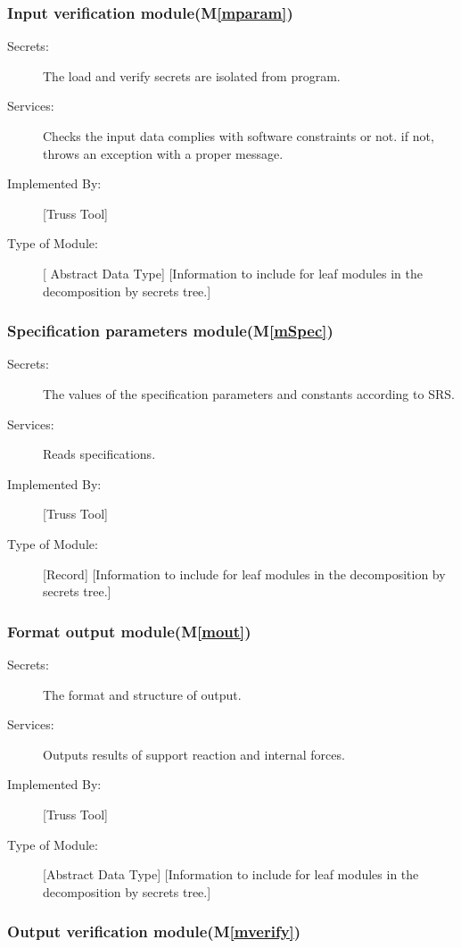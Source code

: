 \documentclass[12pt, titlepage]{article}
\newcommand{\mref}[1]{M\ref{#1}}
\begin{document}
\subsubsection{Input verification module(\mref{mparam})}

\begin{description}
\item[Secrets:]The load and verify secrets are isolated from program.
\item[Services:] Checks the input data complies with software constraints or not. if not, throws an exception with a proper message.
\item[Implemented By:] [Truss Tool]
\item[Type of Module:] [ Abstract Data Type]
  [Information to include for leaf modules in the decomposition by secrets tree.]
\end{description}
\subsubsection{Specification parameters module(\mref{mSpec})}

\begin{description}
\item[Secrets:]The values of the specification parameters and constants according to SRS.
\item[Services:] Reads specifications.
\item[Implemented By:] [Truss Tool]
\item[Type of Module:] [Record]
  [Information to include for leaf modules in the decomposition by secrets tree.]
\end{description}
\subsubsection{Format output module(\mref{mout})}

\begin{description}
\item[Secrets:]The format and structure of output.
\item[Services:] Outputs results of support reaction and internal forces.
\item[Implemented By:] [Truss Tool]
\item[Type of Module:] [Abstract Data Type]
  [Information to include for leaf modules in the decomposition by secrets tree.]
\end{description}
\subsubsection{Output verification module(\mref{mverify})}
\end{document}
